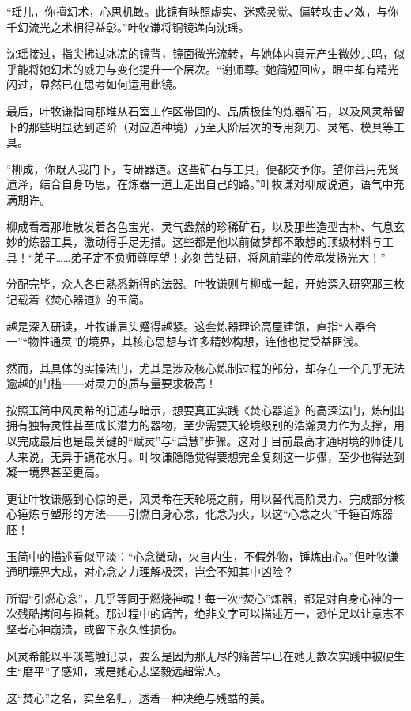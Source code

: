 “瑶儿，你擅幻术，心思机敏。此镜有映照虚实、迷惑灵觉、偏转攻击之效，与你千幻流光之术相得益彰。”叶牧谦将铜镜递向沈瑶。

沈瑶接过，指尖拂过冰凉的镜背，镜面微光流转，与她体内真元产生微妙共鸣，似乎能将她幻术的威力与变化提升一个层次。“谢师尊。”她简短回应，眼中却有精光闪过，显然已在思考如何运用此镜。

最后，叶牧谦指向那堆从石室工作区带回的、品质极佳的炼器矿石，以及风灵希留下的那些明显达到道阶（对应道种境）乃至天阶层次的专用刻刀、灵笔、模具等工具。

“柳成，你既入我门下，专研器道。这些矿石与工具，便都交予你。望你善用先贤遗泽，结合自身巧思，在炼器一道上走出自己的路。”叶牧谦对柳成说道，语气中充满期许。

柳成看着那堆散发着各色宝光、灵气盎然的珍稀矿石，以及那些造型古朴、气息玄妙的炼器工具，激动得手足无措。这些都是他以前做梦都不敢想的顶级材料与工具！“弟子……弟子定不负师尊厚望！必刻苦钻研，将风前辈的传承发扬光大！”

分配完毕，众人各自熟悉新得的法器。叶牧谦则与柳成一起，开始深入研究那三枚记载着《焚心器道》的玉简。

越是深入研读，叶牧谦眉头蹙得越紧。这套炼器理论高屋建瓴，直指“人器合一”“物性通灵”的境界，其核心思想与许多精妙构想，连他也觉受益匪浅。

然而，其具体的实操法门，尤其是涉及核心炼制过程的部分，却存在一个几乎无法逾越的门槛——对灵力的质与量要求极高！

按照玉简中风灵希的记述与暗示，想要真正实践《焚心器道》的高深法门，炼制出拥有独特灵性甚至成长潜力的器物，至少需要天轮境级别的浩瀚灵力作为支撑，用以完成最后也是最关键的“赋灵”与“启慧”步骤。这对于目前最高才通明境的师徒几人来说，无异于镜花水月。叶牧谦隐隐觉得要想完全复刻这一步骤，至少也得达到凝一境界甚至更高。

更让叶牧谦感到心惊的是，风灵希在天轮境之前，用以替代高阶灵力、完成部分核心锤炼与塑形的方法——引燃自身心念，化念为火，以这“心念之火”千锤百炼器胚！

玉简中的描述看似平淡：“心念微动，火自内生，不假外物，锤炼由心。”但叶牧谦通明境界大成，对心念之力理解极深，岂会不知其中凶险？

所谓“引燃心念”，几乎等同于燃烧神魂！每一次“焚心”炼器，都是对自身心神的一次残酷拷问与损耗。那过程中的痛苦，绝非文字可以描述万一，恐怕足以让意志不坚者心神崩溃，或留下永久性损伤。

风灵希能以平淡笔触记录，要么是因为那无尽的痛苦早已在她无数次实践中被硬生生“磨平”了感知，或是她心志坚毅远超常人。

这“焚心”之名，实至名归，透着一种决绝与残酷的美。

